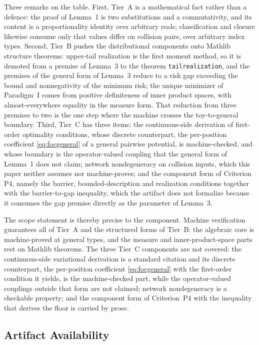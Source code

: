 Three remarks on the table. First, Tier~A is a mathematical fact rather than a defence: the proof of Lemma~1 is two substitutions and a commutativity, and its content is a proportionality identity over arbitrary reals; classification and closure likewise consume only that values differ on collision pairs, over arbitrary index types. Second, Tier~B pushes the distributional components onto Mathlib structure theorems: upper-tail realization is the first moment method, so it is demoted from a premise of Lemma~3 to the theorem \texttt{tail\ttu realization}, and the premises of the general form of Lemma~3 reduce to a risk gap exceeding the bound and nonnegativity of the minimum risk; the unique minimizer of Paradigm~I comes from positive definiteness of inner product spaces, with almost-everywhere equality in the measure form. That reduction from three premises to two is the one step where the machine crosses the toy-to-general boundary. Third, Tier~C has three items: the continuous-side derivation of first-order optimality conditions, whose discrete counterpart, the per-position coefficient \eqref{eq:focgeneral} of a general pairwise potential, is machine-checked, and whose boundary is the operator-valued coupling that the general form of Lemma~1 does not claim; network nondegeneracy on collision inputs, which this paper neither assumes nor machine-proves; and the component form of Criterion P4, namely the barrier, bounded-description and realization conditions together with the barrier-to-gap inequality, which the artifact does not formalize because it consumes the gap premise directly as the parameter of Lemma~3.

The scope statement is thereby precise to the component. Machine verification guarantees all of Tier~A and the structured forms of Tier~B: the algebraic core is machine-proved at general types, and the measure and inner-product-space parts rest on Mathlib theorems. The three Tier~C components are not covered: the continuous-side variational derivation is a standard citation and its discrete counterpart, the per-position coefficient \eqref{eq:focgeneral} with the first-order condition it yields, is the machine-checked part, while the operator-valued couplings outside that form are not claimed; network nondegeneracy is a checkable property; and the component form of Criterion~P4 with the inequality that derives the floor is carried by prose.

\subsection{Artifact Availability}

